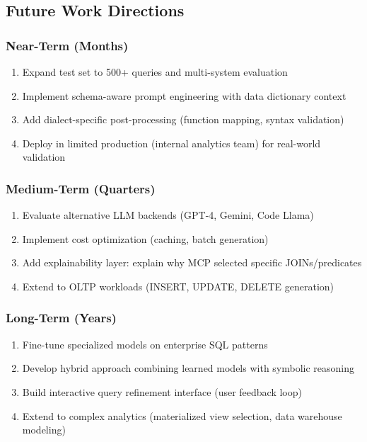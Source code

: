 \subsection{Future Work Directions}

\subsubsection{Near-Term (Months)}

\begin{enumerate}
    \item Expand test set to 500+ queries and multi-system evaluation
    \item Implement schema-aware prompt engineering with data dictionary context
    \item Add dialect-specific post-processing (function mapping, syntax validation)
    \item Deploy in limited production (internal analytics team) for real-world validation
\end{enumerate}

\subsubsection{Medium-Term (Quarters)}

\begin{enumerate}
    \item Evaluate alternative LLM backends (GPT-4, Gemini, Code Llama)
    \item Implement cost optimization (caching, batch generation)
    \item Add explainability layer: explain why MCP selected specific JOINs/predicates
    \item Extend to OLTP workloads (INSERT, UPDATE, DELETE generation)
\end{enumerate}

\subsubsection{Long-Term (Years)}

\begin{enumerate}
    \item Fine-tune specialized models on enterprise SQL patterns
    \item Develop hybrid approach combining learned models with symbolic reasoning
    \item Build interactive query refinement interface (user feedback loop)
    \item Extend to complex analytics (materialized view selection, data warehouse modeling)
\end{enumerate}
